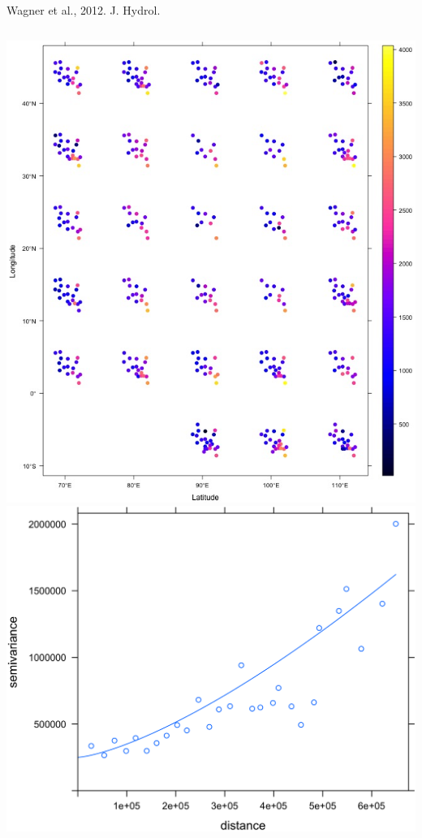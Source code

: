 \documentclass[10pt, compress]{beamer}
\begin{document}
\begin{frame}
{\begin{columns}
    \end{columns}\\
  \hspace{7cm} \footnotesize Wagner et al., 2012. J. Hydrol.}
  {\begin{columns}
  \column{5cm}
    \centering
    \includegraphics[width=1.15\textwidth]{images/SSTP5.png}
    \column{5cm}
    \centering
    \includegraphics[width=1.15\textwidth]{images/SSTP8.png}
    \end{columns}}
\end{frame}
\end{document}
